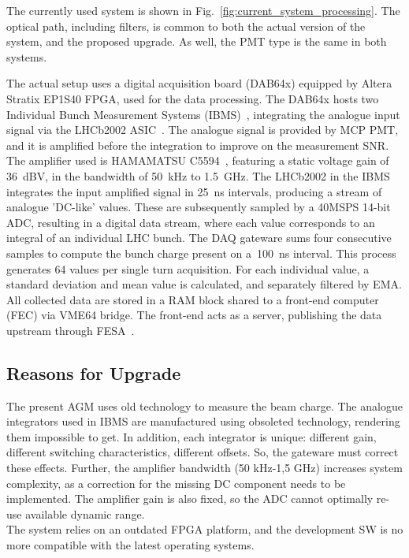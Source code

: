 The currently used system is shown in Fig.~\ref{fig:current_system_processing}.
%
The optical path, including filters, is common to both the actual version of the system, and the proposed upgrade. As well, the PMT type is the same in both systems.

The actual setup uses a digital acquisition board (DAB64x) equipped by Altera Stratix EP1S40 FPGA, used for the data processing.
%
The DAB64x hosts two Individual Bunch Measurement Systems (IBMS)~\cite{ibms}, integrating the analogue input signal via the LHCb2002 ASIC~\cite{lhcb_asic}.
%
The analogue signal is provided by MCP PMT, and it is amplified before the integration to improve on the measurement SNR.
%
The amplifier used is HAMAMATSU C5594~\cite{bsra_first_operation}, featuring a static voltage gain of \SI{36}{dBV}, in the bandwidth of \SI{50}{kHz} to \SI{1.5}{GHz}.
%
The LHCb2002 in the IBMS integrates the input amplified signal in \SI{25}{\nano\second} intervals, producing a stream of analogue 'DC-like' values.
%
These are subsequently sampled by a 40MSPS 14-bit ADC, resulting in a digital data stream, where each value corresponds to an integral of an individual LHC bunch.
%
The DAQ gateware sums four consecutive samples to compute the
bunch charge present on a~\SI{100}{ns} interval.
%
This process generates 64 values per single turn acquisition.
%
For each individual value, a standard deviation and mean value is calculated, and separately filtered by EMA. 
%
All collected data are stored in a RAM block shared to a front-end computer (FEC) via VME64 bridge.
%
The front-end acts as a server, publishing the data upstream through FESA~\cite{fesa}.

\subsection{Reasons for Upgrade}
The present AGM uses old technology to measure the beam charge. 
%
The analogue integrators used in IBMS are manufactured using obsoleted technology, rendering them impossible to get.
%
In addition, each integrator is unique: different gain, different switching characteristics, different offsets. 
%
So, the gateware must correct these effects.
%
Further, the amplifier bandwidth (50 kHz-1,5 GHz) increases system complexity, as a correction for the missing DC component needs to be implemented.
%
The amplifier gain is also fixed, so the ADC cannot optimally re-use available dynamic range.
\\
The system relies on an outdated FPGA platform, and the development SW is no more compatible with the latest operating systems. 

